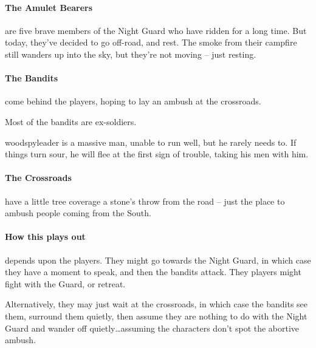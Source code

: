 \begin{multicols}{2}
\paragraph{The Amulet Bearers} are five brave members of the Night Guard who have ridden for a long time.  But today, they've decided to go off-road, and rest.  The smoke from their campfire still wanders up into the sky, but they're not moving -- just resting.


\humansoldier

\paragraph{The Bandits} come behind the players, hoping to lay an ambush at the crossroads.


Most of the bandits are ex-soldiers.

\humansoldier

\woodspyleader

\Gls{woodspyleader} is a massive man, unable to run well, but he rarely needs to.
If things turn sour, he will flee at the first sign of trouble, taking his men with him.

\paragraph{The Crossroads} have a little tree coverage a stone's throw from the road -- just the place to ambush people coming from the South.

\paragraph{How this plays out} depends upon the players.
They might go towards the Night Guard, in which case they have a moment to speak, and then the bandits attack.
They players might fight with the Guard, or retreat.

Alternatively, they may just wait at the crossroads, in which case the bandits see them, surround them quietly, then assume they are nothing to do with the Night Guard and wander off quietly\ldots assuming the characters don't spot the abortive ambush.

\vfill\null



\end{multicols}
